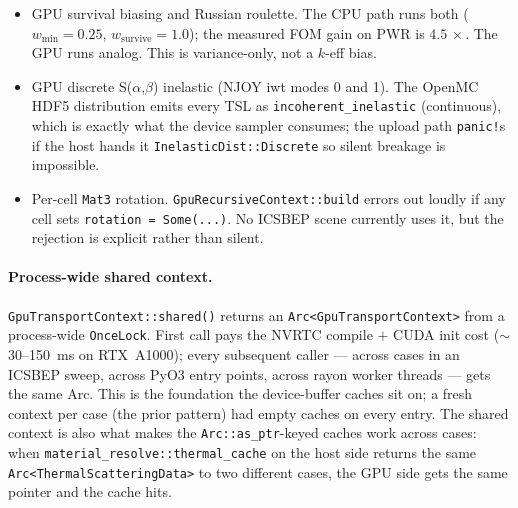 \begin{itemize}
    \item GPU survival biasing and Russian roulette. The CPU path
        runs both ($w_\text{min}=0.25$, $w_\text{survive}=1.0$);
        the measured FOM gain on PWR is $4.5\,\times$. The GPU
        runs analog. This is variance-only, not a $k$-eff bias.
    \item GPU discrete S($\alpha$,$\beta$) inelastic (NJOY iwt
        modes 0 and 1). The OpenMC HDF5 distribution emits every
        TSL as \texttt{incoherent\_inelastic} (continuous),
        which is exactly what the device sampler consumes; the
        upload path \texttt{panic!}s if the host hands it
        \texttt{InelasticDist::Discrete} so silent breakage is
        impossible.
    \item Per-cell \texttt{Mat3} rotation. \texttt{GpuRecursiveContext::build}
        errors out loudly if any cell sets
        \texttt{rotation = Some(...)}. No ICSBEP scene currently
        uses it, but the rejection is explicit rather than
        silent.
\end{itemize}

\paragraph{Process-wide shared context.}
\texttt{GpuTransportContext::shared()} returns an
\texttt{Arc<GpuTransportContext>} from a process-wide
\texttt{OnceLock}. First call pays the
NVRTC compile $+$ CUDA init cost ($\sim$30--150~ms on
RTX~A1000); every subsequent caller --- across cases in an ICSBEP
sweep, across PyO3 entry points, across rayon worker threads ---
gets the same Arc. This is the foundation the device-buffer
caches sit on; a fresh context per case (the prior pattern) had
empty caches on every entry. The shared context is also what
makes the \texttt{Arc::as\_ptr}-keyed caches work across cases:
when \texttt{material\_resolve::thermal\_cache} on the host side
returns the same \texttt{Arc<ThermalScatteringData>} to two
different cases, the GPU side gets the same pointer and the cache
hits.
